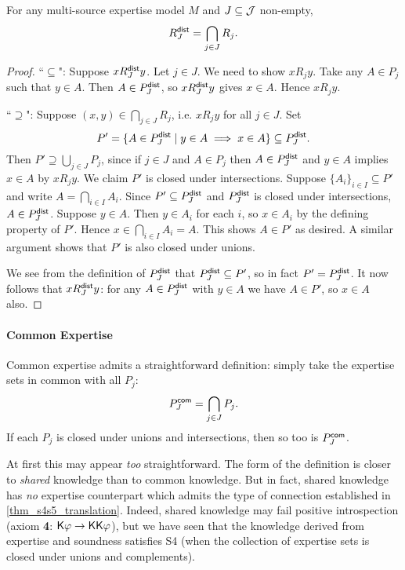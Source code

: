 \begin{proposition}
\label{prop_rpdist}
For any multi-source expertise model $M$ and $J \subseteq \mathcal{J}$ non-empty,
\[
R^{\mathsf{dist}}_J = \bigcap_{j \in J}{R_j}.\]
\end{proposition}

\begin{proof}
    ``$\subseteq$": Suppose $x{R^{\mathsf{dist}}_J}y$. Let $j \in J$.  We need to show
    $x{R_j}y$. Take any $A \in P_j$ such that $y \in A$. Then $A \in P^{\mathsf{dist}}_J$,
    so $x{R^{\mathsf{dist}}_J}y$ gives $x \in A$. Hence $x{R_j}y$.

    ``$\supseteq$": Suppose $(x, y) \in \bigcap_{j \in J}{R_j}$, i.e. $x{R_j}y$
    for all $j \in J$. Set
    \[
        P' = \{A \in P^{\mathsf{dist}}_J \mid y \in A \implies x \in A\}
        \subseteq P^{\mathsf{dist}}_J.
    \]
    Then $P' \supseteq \bigcup_{j \in J}{P_j}$, since if $j \in J$ and $A \in
    P_j$ then $A \in P^{\mathsf{dist}}_J$ and $y \in A$ implies $x \in A$ by $x{R_j}y$.
    We claim $P'$ is closed under intersections. Suppose $\{A_i\}_{i \in I}
    \subseteq P'$ and write $A = \bigcap_{i \in I}{A_i}$. Since $P' \subseteq
    P^{\mathsf{dist}}_J$ and $P^{\mathsf{dist}}_J$ is closed under intersections, $A \in P^{\mathsf{dist}}_J$.
    Suppose $y \in A$.  Then $y \in A_i$ for each $i$, so $x \in A_i$ by the
    defining property of $P'$. Hence $x \in \bigcap_{i \in I}{A_i} = A$. This
    shows $A \in P'$ as desired. A similar argument shows that $P'$ is also
    closed under unions.

    We see from the definition of $P^{\mathsf{dist}}_J$ that $P^{\mathsf{dist}}_J \subseteq P'$, so
    in fact $P' = P^{\mathsf{dist}}_J$. It now follows that $x{R^{\mathsf{dist}}_J}y$: for any $A \in
    P^{\mathsf{dist}}_J$ with $y \in A$ we have $A \in P'$, so $x \in A$ also.

\end{proof}

\paragraph{Common Expertise}

Common expertise admits a straightforward definition: simply take the expertise
sets in common with all $P_j$:
\[
P^{\mathsf{com}}_J = \bigcap_{j \in J}{P_j}.\]
If each $P_j$ is closed under unions and intersections, then so too is
$P^{\mathsf{com}}_J$.

At first this may appear \emph{too} straightforward. The form of the definition
is closer to \emph{shared} knowledge than to common knowledge. But in fact,
shared knowledge has \emph{no} expertise counterpart which admits the type of
connection established in \cref{thm_s4s5_translation}. Indeed, shared knowledge
may fail positive introspection (axiom \textbf{4}: $\mathsf{K}\varphi \to
\mathsf{K}\mathsf{K}\varphi$), but we have seen that the knowledge derived from expertise and
soundness satisfies S4 (when the collection of expertise sets is closed under
unions and complements).

